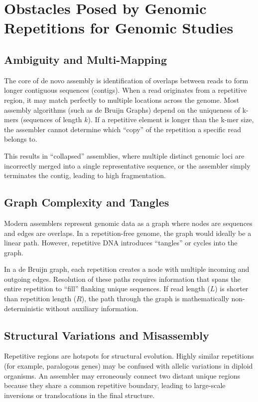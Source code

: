 \section{Obstacles Posed by Genomic Repetitions for Genomic Studies}

\subsection{Ambiguity and Multi-Mapping}

The core of de novo assembly is identification of overlaps between reads to form longer contiguous sequences (contigs). When a read originates from a repetitive region, it may match perfectly to multiple locations across the genome. Most assembly algorithms (such as de Bruijn Graphs) depend on the uniqueness of k-mers (sequences of length $k$). If a repetitive element is longer than the k-mer size, the assembler cannot determine which ``copy'' of the repetition a specific read belongs to.

This results in ``collapsed'' assemblies, where multiple distinct genomic loci are incorrectly merged into a single representative sequence, or the assembler simply terminates the contig, leading to high fragmentation.

\subsection{Graph Complexity and Tangles}

Modern assemblers represent genomic data as a graph where nodes are sequences and edges are overlaps. In a repetition-free genome, the graph would ideally be a linear path. However, repetitive DNA introduces ``tangles'' or cycles into the graph.

In a de Bruijn graph, each repetition creates a node with multiple incoming and outgoing edges. Resolution of these paths requires information that spans the entire repetition to ``fill'' flanking unique sequences. If read length ($L$) is shorter than repetition length ($R$), the path through the graph is mathematically non-deterministic without auxiliary information.

\subsection{Structural Variations and Misassembly}

Repetitive regions are hotspots for structural evolution. Highly similar repetitions (for example, paralogous genes) may be confused with allelic variations in diploid organisms. An assembler may erroneously connect two distant unique regions because they share a common repetitive boundary, leading to large-scale inversions or translocations in the final structure.

